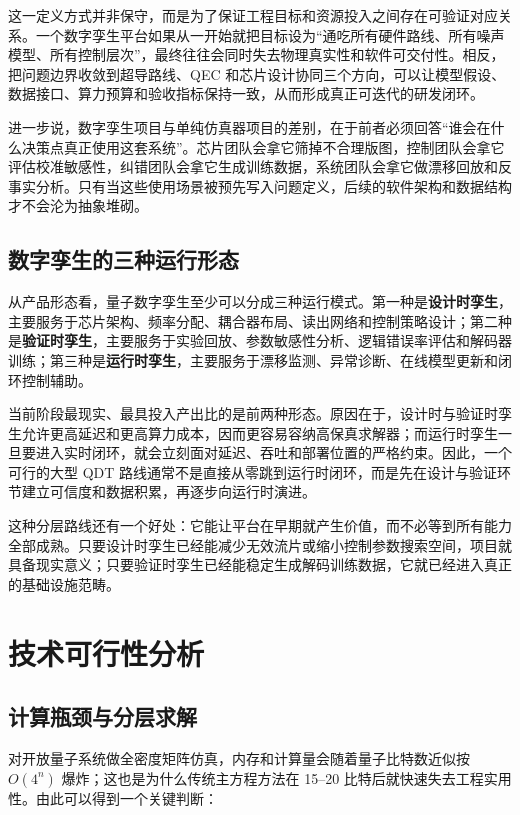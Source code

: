 \documentclass[11pt,a4paper]{article}
\newcommand{\QDT}{QDT}
\newcommand{\QEC}{QEC}
\begin{document}
这一定义方式并非保守，而是为了保证工程目标和资源投入之间存在可验证对应关系。一个数字孪生平台如果从一开始就把目标设为“通吃所有硬件路线、所有噪声模型、所有控制层次”，最终往往会同时失去物理真实性和软件可交付性。相反，把问题边界收敛到超导路线、\QEC{} 和芯片设计协同三个方向，可以让模型假设、数据接口、算力预算和验收指标保持一致，从而形成真正可迭代的研发闭环。

进一步说，数字孪生项目与单纯仿真器项目的差别，在于前者必须回答“谁会在什么决策点真正使用这套系统”。芯片团队会拿它筛掉不合理版图，控制团队会拿它评估校准敏感性，纠错团队会拿它生成训练数据，系统团队会拿它做漂移回放和反事实分析。只有当这些使用场景被预先写入问题定义，后续的软件架构和数据结构才不会沦为抽象堆砌。

\subsection{数字孪生的三种运行形态}

从产品形态看，量子数字孪生至少可以分成三种运行模式。第一种是\textbf{设计时孪生}，主要服务于芯片架构、频率分配、耦合器布局、读出网络和控制策略设计；第二种是\textbf{验证时孪生}，主要服务于实验回放、参数敏感性分析、逻辑错误率评估和解码器训练；第三种是\textbf{运行时孪生}，主要服务于漂移监测、异常诊断、在线模型更新和闭环控制辅助。

当前阶段最现实、最具投入产出比的是前两种形态。原因在于，设计时与验证时孪生允许更高延迟和更高算力成本，因而更容易容纳高保真求解器；而运行时孪生一旦要进入实时闭环，就会立刻面对延迟、吞吐和部署位置的严格约束。因此，一个可行的大型 \QDT{} 路线通常不是直接从零跳到运行时闭环，而是先在设计与验证环节建立可信度和数据积累，再逐步向运行时演进。

这种分层路线还有一个好处：它能让平台在早期就产生价值，而不必等到所有能力全部成熟。只要设计时孪生已经能减少无效流片或缩小控制参数搜索空间，项目就具备现实意义；只要验证时孪生已经能稳定生成解码训练数据，它就已经进入真正的基础设施范畴。

\section{技术可行性分析}

\subsection{计算瓶颈与分层求解}

对开放量子系统做全密度矩阵仿真，内存和计算量会随着量子比特数近似按 $O(4^n)$ 爆炸；这也是为什么传统主方程方法在 15--20 比特后就快速失去工程实用性。由此可以得到一个关键判断：
\end{document}
